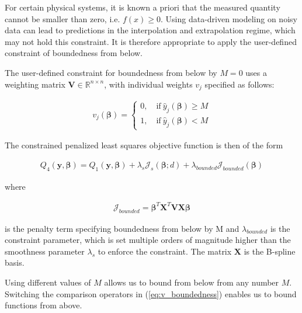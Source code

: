 \documentclass[10pt,a4paper]{article}
\begin{document}
	For certain physical systems, it is known a priori that the measured quantity cannot be smaller than zero, i.e. $f(x) \ge 0$. Using data-driven modeling on noisy data can lead to predictions in the interpolation and extrapolation regime, which may not hold this constraint. It is therefore appropriate to apply the user-defined constraint of boundedness from below.
	
	The user-defined constraint for boundedness from below by $M=0$ uses a weighting matrix $\boldsymbol{V} \in \mathbb{R}^{n\times n}$, with individual weights $v_j$ specified as follows:
	
	\begin{align} \label{eq:v_boundedness}
		v_j(\boldsymbol{\beta}) = \begin{cases} 
										0, \quad \text{if} \ \hat y_j(\boldsymbol{\beta}) \ge M\\ 
										1, \quad \text{if} \ \hat y_j(\boldsymbol{\beta})  < M 		
			  \end{cases}
	\end{align}
	
	The constrained penalized least squares objective function is then of the form
	
	\begin{align}\label{eq:OF_4}
		Q_4(\boldsymbol{y}, \boldsymbol{\beta}) = Q_1(\boldsymbol{y}, \boldsymbol{\beta}) + \lambda_s \mathcal J_s(\boldsymbol{\beta}; d) + \lambda_{bounded} \mathcal J_{bounded}(\boldsymbol{\beta}) 
	\end{align}
	
	where

	\begin{align}\label{eq:J_bounded}
	 	\mathcal J_{bounded} = \boldsymbol{\beta}^T \boldsymbol{X}^T \boldsymbol{V} \boldsymbol{X} \boldsymbol{\beta} 	
	\end{align}
	
	is the penalty term specifying boundedness from below by M and $\lambda_{bounded}$ is the constraint parameter, which is set multiple orders of magnitude higher than the smoothness parameter $\lambda_s$ to enforce the constraint. The matrix $\boldsymbol{X}$ is the B-spline basis. 
	
	Using different values of $M$ allows us to bound from below from any number $M$. Switching the comparison operators in (\ref{eq:v_boundedness}) enables us to bound functions from above. 
	
\end{document}
